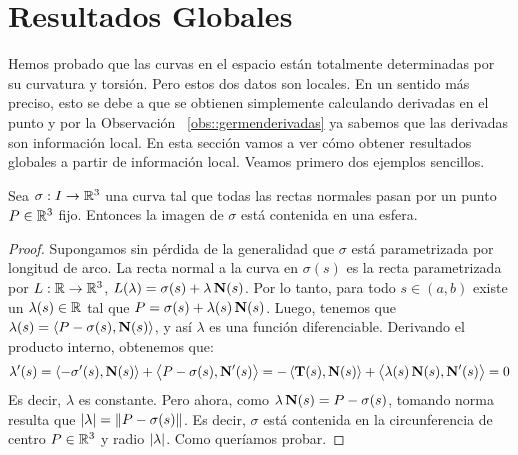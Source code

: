 \section{Resultados Globales}

Hemos probado que las curvas en el espacio están totalmente determinadas por su curvatura y torsión. Pero estos dos datos son locales. En un sentido más preciso, esto se debe a que se obtienen simplemente calculando derivadas en el punto y por la Observación ~\ref{obs::germenderivadas} ya sabemos que las derivadas son información local. En esta sección vamos a ver cómo obtener resultados globales a partir de información local. Veamos primero dos ejemplos sencillos.

\begin{prop}
Sea $\sigma:I\to\mathbb{R}^3$ una curva tal que todas las rectas normales pasan por un punto $P\in\mathbb{R}^3$ fijo. Entonces la imagen de $\sigma$ está contenida en una esfera.
\begin{proof}
Supongamos sin pérdida de la generalidad que $\sigma$ está parametrizada por longitud de arco. La recta normal a la curva en $\sigma(s)$ es la recta parametrizada por $L:\mathbb{R}\to\mathbb{R}^3$, $L(\lambda)=\sigma(s)+\lambda\operatorname{\mathbf{N}}(s)$. Por lo tanto, para todo $s\in(a,b)$ existe un $\lambda(s)\in\mathbb{R}$ tal que $P=\sigma(s)+\lambda(s)\operatorname{\mathbf{N}}(s)$. Luego, tenemos que $\lambda(s) = \left\langle P-\sigma(s),\operatorname{\mathbf{N}}(s) \right\rangle$, y así $\lambda$ es una función diferenciable. Derivando el producto interno, obtenemos que: $$\lambda'(s) = \left\langle -\sigma'(s),\operatorname{\mathbf{N}}(s) \right\rangle+\left\langle P-\sigma(s),\operatorname{\mathbf{N}}'(s) \right\rangle = -\left\langle \operatorname{\mathbf{T}}(s),\operatorname{\mathbf{N}}(s) \right\rangle+\left\langle \lambda(s)\operatorname{\mathbf{N}}(s),\operatorname{\mathbf{N}}'(s) \right\rangle = 0$$ Es decir, $\lambda$ es constante. Pero ahora, como $\lambda\operatorname{\mathbf{N}}(s)=P-\sigma(s)$, tomando norma resulta que $\left\lvert \lambda \right\rvert = \left\| P-\sigma(s) \right\|$. Es decir, $\sigma$ está contenida en la circunferencia de centro $P\in\mathbb{R}^3$ y radio $\left\lvert \lambda \right\rvert$. Como queríamos probar.
\end{proof}
\end{prop}

